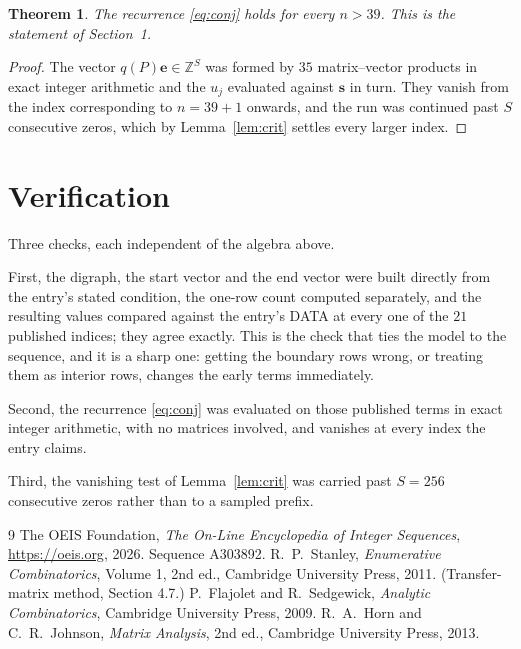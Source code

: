 \documentclass[11pt,a4paper]{article}
\theoremstyle{plain}
\newtheorem{theorem}{Theorem}
\theoremstyle{definition}
\begin{document}
\begin{theorem}
The recurrence \eqref{eq:conj} holds for every $n>39$. This is the statement of
Section~1.
\end{theorem}

\begin{proof}
The vector $q(P)\mathbf{e}\in\mathbb{Z}^{S}$ was formed by $35$ matrix--vector
products in exact integer arithmetic and the $u_j$ evaluated against $\mathbf{s}$ in turn.
They vanish from the index corresponding to $n=39+1$ onwards, and the run was continued
past $S$ consecutive zeros, which by Lemma~\ref{lem:crit} settles every larger index.
\end{proof}

\section{Verification}

Three checks, each independent of the algebra above.

First, the digraph, the start vector and the end vector were built directly from the
entry's stated condition, the one-row count computed separately, and the resulting values
compared against the entry's DATA at every one of the $21$ published indices; they
agree exactly. This is the check that ties the model to the sequence, and it is a sharp one:
getting the boundary rows wrong, or treating them as interior rows, changes the early terms
immediately.

Second, the recurrence \eqref{eq:conj} was evaluated on those published terms in exact
integer arithmetic, with no matrices involved, and vanishes at every index the entry claims.

Third, the vanishing test of Lemma~\ref{lem:crit} was carried past $S=256$ consecutive
zeros rather than to a sampled prefix.

\begin{thebibliography}{9}
 The OEIS Foundation, \emph{The On-Line Encyclopedia of Integer
Sequences}, \url{https://oeis.org}, 2026. Sequence A303892.
 R.~P.~Stanley, \emph{Enumerative Combinatorics}, Volume 1, 2nd ed.,
Cambridge University Press, 2011. (Transfer-matrix method, Section 4.7.)
 P.~Flajolet and R.~Sedgewick, \emph{Analytic Combinatorics}, Cambridge
University Press, 2009.
 R.~A.~Horn and C.~R.~Johnson, \emph{Matrix Analysis}, 2nd ed., Cambridge
University Press, 2013.
\end{thebibliography}
\end{document}
